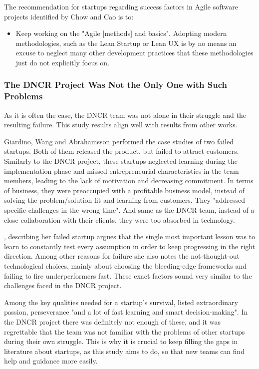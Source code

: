 \documentclass{article}
\begin{document}
The recommendation for startups regarding success factors in Agile software projects identified by Chow and Cao is to:
\begin{itemize}
\item Keep working on the "Agile [methods] and basics". Adopting modern methodologies, such as the Lean Startup or Lean UX is by no means an excuse to neglect many other development practices that these methodologies just do not explicitly focus on.
\end{itemize}

\subsubsection{The DNCR Project Was Not the Only One with Such Problems}
As it is often the case, the DNCR team was not alone in their struggle and the resulting failure. This study results align well with results from other works.

Giardino, Wang and Abrahamsson \citep{giardino2014early} performed the case studies of two failed startups. Both of them released the product, but failed to attract customers. Similarly to the DNCR project, these startups neglected learning during the implementation phase and missed entrepreneurial characteristics in the team members, leading to the lack of motivation and decreasing commitment. In terms of business, they were preoccupied with a profitable business model, instead of solving the problem/solution fit and learning from customers. They "addressed specific challenges in the wrong time". And same as the DNCR team, instead of a close collaboration with their clients, they were too absorbed in technology.

\cite{may2012applying}, describing her failed startup argues that the single most important lesson was to learn to constantly test every assumption in order to keep progressing in the right direction. Among other reasons for failure she also notes the not-thought-out technological choices, mainly about choosing the bleeding-edge frameworks and failing to fire underperformers fast. These exact factors sound very similar to the challenges faced in the DNCR project.


Among the key qualities needed for a startup's survival, \citeauthor{may2012applying} listed extraordinary passion, perseverance "and a lot of fast learning and smart decision-making". In the DNCR project there was definitely not enough of these, and it was regrettable that the team was not familiar with the problems of other startups during their own struggle. This is why it is crucial to keep filling the gaps in literature about startups, as this study aims to do, so that new teams can find help and guidance more easily.
\end{document}

